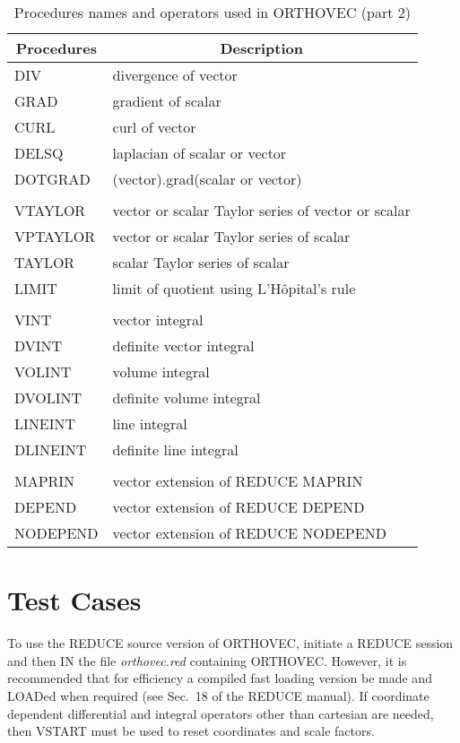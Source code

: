 \begin{table}
\begin{center}
\begin{tabular}{|l l|} \hline 
\multicolumn{1}{|c}{Procedures} & \multicolumn{1}{c|}{Description} \\ \hline 
DIV & divergence of vector \\ 
GRAD & gradient of scalar \\ 
CURL & curl of vector \\ 
DELSQ & laplacian of scalar or vector \\ 
DOTGRAD & (vector).grad(scalar or vector) \\ &  \\ 
VTAYLOR & vector or scalar Taylor series of vector or scalar \\ 
VPTAYLOR & vector or scalar Taylor series of scalar \\ 
TAYLOR & scalar Taylor series of scalar \\
LIMIT & limit of quotient using L'H\^opital's rule \\ &  \\
VINT & vector integral \\ 
DVINT & definite vector integral \\ 
VOLINT & volume integral \\ 
DVOLINT & definite volume integral \\ 
LINEINT & line integral \\ 
DLINEINT & definite line integral \\  & \\
MAPRIN & vector extension of REDUCE MAPRIN \\
DEPEND & vector extension of REDUCE DEPEND \\
NODEPEND & vector extension of REDUCE NODEPEND \\ \hline 
\end{tabular}
\end{center}
\caption{Procedures names and operators used in ORTHOVEC (part 2)}
\end{table}


\section{Test Cases}

To use the REDUCE source version of ORTHOVEC, initiate a REDUCE
session and then IN the file {\em orthovec.red} containing ORTHOVEC.
However, it is recommended that for efficiency a compiled fast loading
version be made and LOADed when required (see Sec.~18 of the REDUCE
manual).  If coordinate dependent differential and integral operators
other than cartesian are needed, then VSTART must be used to reset
coordinates and scale factors.

